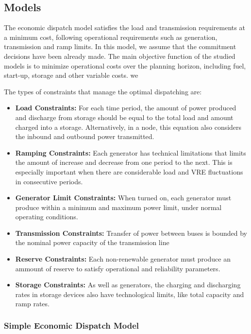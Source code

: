 \documentclass[12pt,LUDisStyle,twosided]{book}
\begin{document}
\subsection{Models}
The economic dispatch model satisfies the load and transmission requirements at a minimum cost, following operational requirements such as generation, transmission and ramp limits. In this model, we assume that the commitment decisions have been already made. The main objective function of the studied models is to minimize operational costs over the planning horizon, including fuel, start-up, storage and other variable costs.
we

The types of constraints that manage the optimal dispatching are:

\begin{itemize}
\item \textbf{Load Constraints:} For each time period, the amount of power produced and discharge from storage should be equal to the total load and amount charged into a storage. Alternatively, in a node, this equation also considers the inbound and outbound power transmitted.
\item \textbf{Ramping Constraints:}  Each generator has technical limitations that limits the amount of increase and decrease from one period to the next. This is especially important when there are considerable load and VRE fluctuations in consecutive periods.
\item \textbf{Generator Limit Constraints:} When turned on, each generator must produce within a minimum and maximum power limit, under normal operating conditions.
\item \textbf{Transmission Constraints:} Transfer of power between buses is bounded by the nominal power capacity of the transmission line
\item \textbf{Reserve Constraints:} Each non-renewable generator must produce an ammount of reserve to satisfy operational and reliability parameters.
\item \textbf{Storage Constraints:} As well as generators, the charging and discharging rates in storage devices also have technological limits, like total capacity and ramp rates.


\end{itemize}

\subsubsection{Simple Economic Dispatch Model}
\end{document}
